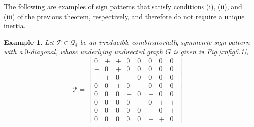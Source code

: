 \documentclass[a4paper, 10pt]{article}
\newtheorem{eg}{Example}[section]
\numberwithin{equation}{section}
\begin{document}
The following are examples of sign patterns that satisfy conditions (i), (ii), and (iii) of the previous theorem, respectively, and therefore do not require a unique inertia.

\begin{eg}
	Let $\mathcal{P}\in \mathcal{Q}_8$ be an irreducible combinatorially symmetric sign pattern with a $0$-diagonal, whose underlying undirected graph $G$ is  given in Fig.\ref{xnfig5.1},
	\[
	\mathcal{P} =
	\begin{bmatrix}
		0 & + & + & 0 & 0 & 0 & 0 & 0 \\
		- & 0 & + & 0 & 0 & 0 & 0 & 0 \\
		+ & + & 0 & + & 0 & 0 & 0 & 0 \\
		0 & 0 & + & 0 & + & 0 & 0 & 0 \\
		0 & 0 & 0 & - & 0 & + & 0 & 0 \\
		0 & 0 & 0 & 0 & + & 0 & + & + \\
		0 & 0 & 0 & 0 & 0 & + & 0 & + \\
		0 & 0 & 0 & 0 & 0 & + & + & 0
	\end{bmatrix}
	\]
	
	\begin{figure}[H]
		\centering
		\tikzset{node distance=1cm}
\end{figure}
\end{eg}
\end{document}
